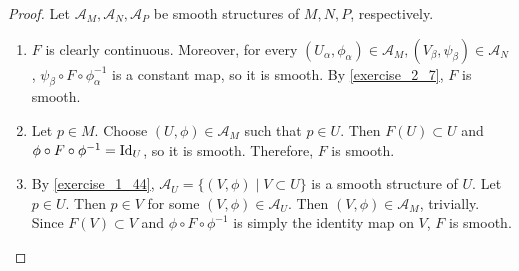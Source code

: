 \begin{proof}
  Let $\mathcal{A}_M, \mathcal{A}_N, \mathcal{A}_P$ be smooth structures of $M, N, P$, respectively.
  \begin{enumerate}[label=(\alph*)]
    \item 
      $F$ is clearly continuous.
      Moreover, for every $(U_{\alpha}, \phi_{\alpha}) \in \mathcal{A}_M, (V_{\beta}, \psi_{\beta}) \in \mathcal{A}_N$, $\psi_{\beta} \circ F \circ \phi_{\alpha}^{-1}$ is a constant map, so it is smooth.
      By \ref{exercise_2_7}, $F$ is smooth.
    \item
      Let $p \in M$.
      Choose $(U, \phi) \in \mathcal{A}_M$ such that $p \in U$.
      Then $F(U) \subset U$ and $\phi \circ F \circ \phi^{-1} = \operatorname{Id}_U$, so it is smooth.
      Therefore, $F$ is smooth.
    \item
      By \ref{exercise_1_44}, $\mathcal{A}_U = \{ (V, \phi) \mid V \subset U \}$ is a smooth structure of $U$.
      Let $p \in U$.
      Then $p \in V$ for some $(V, \phi) \in \mathcal{A}_U$.
      Then $(V, \phi) \in \mathcal{A}_M$, trivially.
      Since $F(V) \subset V$ and $\phi \circ F \circ \phi^{-1}$ is simply the identity map on $V$, $F$ is smooth.
  \end{enumerate}
\end{proof}

